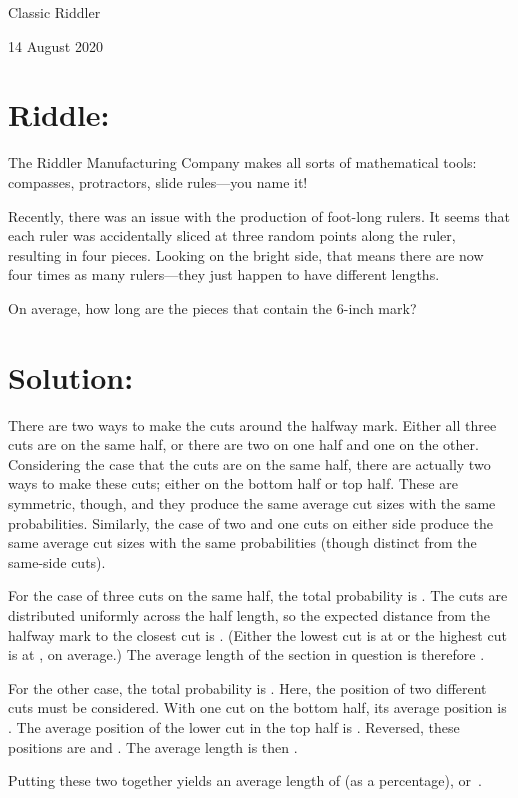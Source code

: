 \documentclass{article}
\begin{document}
\pagestyle{empty} %

\begin{center}
{\LARGE Classic Riddler}

\vspace{0.15in}

{\Large 14 August 2020}
\end{center}


\section*{Riddle:}

The Riddler Manufacturing Company makes all sorts of mathematical tools: compasses, protractors, slide rules---you name it!

Recently, there was an issue with the production of foot-long rulers.
It seems that each ruler was accidentally sliced at three random points along the ruler, resulting in four pieces.
Looking on the bright side, that means there are now four times as many rulers---they just happen to have different lengths.

On average, how long are the pieces that contain the 6-inch mark?

\section*{Solution:}

There are two ways to make the cuts around the halfway mark.
Either all three cuts are on the same half, or there are two on one half and one on the other.
Considering the case that the cuts are on the same half, there are actually two ways to make these cuts; either on the bottom half or top half.
These are symmetric, though, and they produce the same average cut sizes with the same probabilities.
Similarly, the case of two and one cuts on either side produce the same average cut sizes with the same probabilities (though distinct from the same-side cuts).

For the case of three cuts on the same half, the total probability is .
The cuts are distributed uniformly across the half length, so the expected distance from the halfway mark to the closest cut is .
(Either the lowest cut is at  or the highest cut is at , on average.)
The average length of the section in question is therefore .

For the other case, the total probability is .
Here, the position of two different cuts must be considered.
With one cut on the bottom half, its average position is .
The average position of the lower cut in the top half is .
Reversed, these positions are  and .
The average length is then .

Putting these two together yields an average length of  (as a percentage), or
\,.
\end{document}
